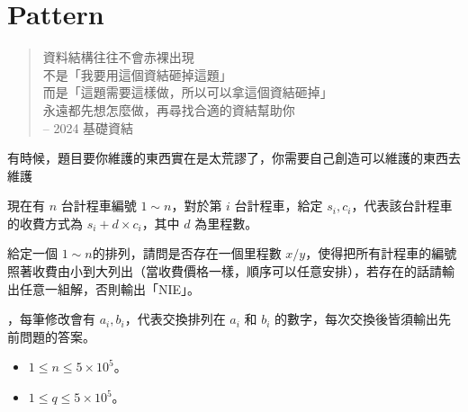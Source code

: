 \section{Pattern}

\begin{frame}{\ebtitle}
    \begin{quote}
        資料結構往往不會赤裸出現 \\
    
        不是「我要用這個資結砸掉這題」\\
        而是「這題需要這樣做，所以可以拿這個資結砸掉」\\
        永遠都先想怎麼做，再尋找合適的資結幫助你 \\

        -- 2024 基礎資結
    \end{quote}

     {
        有時候，題目要你維護的東西實在是太荒謬了，你需要自己創造可以維護的東西去維護
    }
\end{frame}

\begin{frame}{}
    \begin{problem}
        現在有 $n$ 台計程車編號 $1\sim n$，對於第 $i$ 台計程車，給定 $s_i,c_i$，代表該台計程車的收費方式為 $s_i + d\times c_i$，其中 $d$ 為里程數。

        給定一個 $1\sim n$的排列，請問是否存在一個里程數 $x/y$，使得把所有計程車的編號照著收費由小到大列出（當收費價格一樣，順序可以任意安排），若存在的話請輸出任意一組解，否則輸出「NIE」。

         {
            ，每筆修改會有 $a_i,b_i$，代表交換排列在 $a_i$ 和 $b_i$ 的數字，每次交換後皆須輸出先前問題的答案。
        }

        \begin{itemize}
            \item $1\le n\le 5\times10^5$。
            \item $1\le q\le 5\times10^5$。
        \end{itemize}
    \end{problem}
\end{frame}

